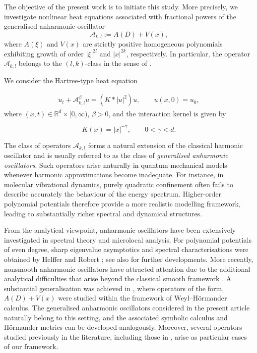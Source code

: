 \documentclass[12pt,reqno,a4paper]{amsart}
\numberwithin{equation}{section}
\theoremstyle{plain}
\theoremstyle{definition}
\theoremstyle{remark}
\def \Ad{\mathcal{A}_{k,l}}
\begin{document}
The objective of the present work is to initiate this study. More precisely, we investigate nonlinear heat equations associated with fractional powers of the generalised anharmonic oscillator
\[
\mathcal{A}_{k,l}
:=
A(D)+V(x),
\]
where $A(\xi)$ and $V(x)$ are strictly positive homogeneous polynomials exhibiting growth of order $|\xi|^{2l}$ and $|x|^{2k}$, respectively. In particular, the operator $\mathcal{A}_{k,l}$ belongs to the $(l,k)$-class in the sense of \cite{MR4489248}.

 We consider the Hartree-type heat equation

\begin{align}
\label{harteeintro}
u_t+\Ad^\beta u=(K*|u|^2)u,
\qquad 
u(x,0)=u_0,
\end{align}
where $(x,t)\in \mathbb{R}^d\times [0,\infty)$, $\beta>0$, and the interaction kernel is given by

\[
K(x)=|x|^{-\gamma},
\qquad 
0<\gamma<d.
\]

The class of operators $\mathcal{A}_{k,l}$ forms a natural extension of the classical harmonic oscillator and is usually referred to as the class of \emph{generalised anharmonic oscillators}. Such operators arise naturally in quantum mechanical models whenever harmonic approximations become inadequate. For instance, in molecular vibrational dynamics, purely quadratic confinement often fails to describe accurately the behaviour of the energy spectrum. Higher-order polynomial potentials therefore provide a more realistic modelling framework, leading to substantially richer spectral and dynamical structures.

From the analytical viewpoint, anharmonic oscillators have been extensively investigated in spectral theory and microlocal analysis. For polynomial potentials of even degree, sharp eigenvalue asymptotics and spectral characterisations were obtained by Helffer and Robert \cite{MR657970,MR683006,MR662451}; see also \cite{MR743094,MR2304165,MR2599384} for further developments. More recently, nonsmooth anharmonic oscillators have attracted attention due to the additional analytical difficulties that arise beyond the classical smooth framework \cite{MR3554704}. A substantial generalisation was achieved in \cite{MR4489248}, where operators of the form, $A(D)+V(x)$ were studied within the framework of Weyl--H\"ormander calculus. The generalised anharmonic oscillators considered in the present article naturally belong to this setting, and the associated symbolic calculus and H\"ormander metrics can be developed analogously. Moreover, several operators studied previously in the literature, including those in \cite{MR4299820,MR4944933, dasgupta2026phase}, arise as particular cases of our framework.
\end{document}
